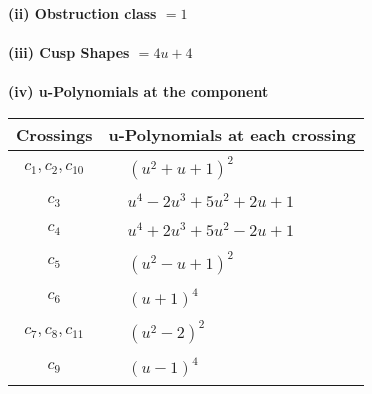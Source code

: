 \documentclass[1p]{elsarticle_modified}
\theoremstyle{definition}
\begin{document}
\flushleft \textbf{(ii) Obstruction class $= 1$}\\~\\
\flushleft \textbf{(iii) Cusp Shapes $= 4 u+4$}\\~\\
\newpage\renewcommand{\arraystretch}{1}
\flushleft \textbf{(iv) u-Polynomials at the component}\newline \\
\begin{tabular}{m{50pt}|m{274pt}}
Crossings & \hspace{64pt}u-Polynomials at each crossing \\
\hline $$\begin{aligned}c_{1},c_{2},c_{10}\end{aligned}$$&$\begin{aligned}
&(u^2+u+1)^2
\end{aligned}$\\
\hline $$\begin{aligned}c_{3}\end{aligned}$$&$\begin{aligned}
&u^4-2 u^3+5 u^2+2 u+1
\end{aligned}$\\
\hline $$\begin{aligned}c_{4}\end{aligned}$$&$\begin{aligned}
&u^4+2 u^3+5 u^2-2 u+1
\end{aligned}$\\
\hline $$\begin{aligned}c_{5}\end{aligned}$$&$\begin{aligned}
&(u^2- u+1)^2
\end{aligned}$\\
\hline $$\begin{aligned}c_{6}\end{aligned}$$&$\begin{aligned}
&(u+1)^4
\end{aligned}$\\
\hline $$\begin{aligned}c_{7},c_{8},c_{11}\end{aligned}$$&$\begin{aligned}
&(u^2-2)^2
\end{aligned}$\\
\hline $$\begin{aligned}c_{9}\end{aligned}$$&$\begin{aligned}
&(u-1)^4
\end{aligned}$\\
\hline
\end{tabular}\\~\\
\end{document}
